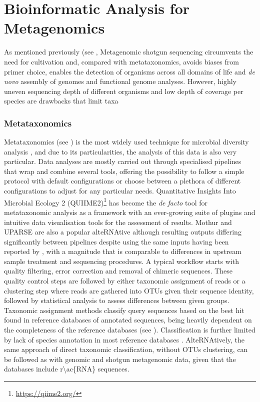 \section{Bioinformatic Analysis for Metagenomics} \label{sec:_intro_metagenomics_bioinfo}

As mentioned previously (see , Metagenomic shotgun sequencing circumvents the need for cultivation and, compared with metataxonomics, avoids biases from primer choice, enables the detection of organisms across all domains of life and \textit{de novo} assembly of genomes and functional genome analyses. However, highly uneven sequencing depth of different organisms and low depth of coverage per species are drawbacks that limit taxa

\subsubsection{Metataxonomics} \label{ssec:_intro_metataxonomics_bioinfo}

Metataxonomics (see ) is the most widely used technique for microbial diversity analysis \citep{hilton_metataxonomic_2016}, and due to its particularities, the analysis of this data is also very particular. Data analyses are mostly carried out through specialised pipelines that wrap and combine several tools, offering the possibility to follow a simple protocol with default configurations or choose between a plethora of different configurations to adjust for any particular needs. Quantitative Insights Into Microbial Ecology 2 (QUIIME2)\footnote{\url{https://qiime2.org/}} \citep{bolyen_reproducible_2019} has become the \textit{de facto} tool for metataxonomic analysis as a framework with an ever-growing suite of plugins and intuitive data visualisation tools for the assessment of results. Mothur \citep{schloss_introducing_2009} and UPARSE \citep{edgar_uparse_2013} are also a popular alte\ac{RNA}tive although resulting outputs differing significantly between pipelines despite using the same inputs having been reported by \cite{marizzoni_comparison_2020}, with a magnitude that is comparable to differences in upstream sample treatment and sequencing procedures.  A typical workflow starts with quality filtering, error correction and removal of chimeric sequences. These quality control steps are followed by either taxonomic assignment of reads or a clustering step where reads are gathered into \ac{OTUs} given their sequence identity, followed by statistical analysis to assess differences between given groups. Taxonomic assignment methods classify query sequences based on the best hit found in reference databases of annotated sequences, being heavily dependent on the completeness of the reference databases (see ). Classification is further limited by lack of species annotation in most reference databases \citep{westcott_novo_2015}. Alte\ac{RNA}tively, the same approach of direct taxonomic classification, without \ac{OTUs} clustering, can be followed as with genomic and shotgun metagenomic data, given that the databases include \ac{r\ac{RNA}} sequences.

